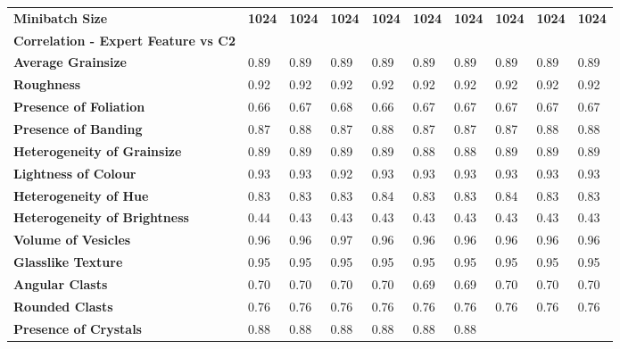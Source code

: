 \begin{longtable}[c]{@{}llllllllll@{}}
\textbf{Minibatch Size} &
  \cellcolor[HTML]{FCE4D6}\textbf{1024} &
  \cellcolor[HTML]{FCE4D6}\textbf{1024} &
  \cellcolor[HTML]{FCE4D6}\textbf{1024} &
  \cellcolor[HTML]{FCE4D6}\textbf{1024} &
  \cellcolor[HTML]{FCE4D6}\textbf{1024} &
  \cellcolor[HTML]{FCE4D6}\textbf{1024} &
  \cellcolor[HTML]{FCE4D6}\textbf{1024} &
  \cellcolor[HTML]{FCE4D6}\textbf{1024} &
  \cellcolor[HTML]{FCE4D6}\textbf{1024} \\
\rowcolor[HTML]{F2F2F2} 
\textbf{Correlation - Expert Feature   vs C2} &
  \textbf{} &
  \textbf{} &
  \textbf{} &
  \textbf{} &
  \textbf{} &
  \textbf{} &
  \textbf{} &
  \textbf{} &
  \textbf{} \\
\textbf{Average Grainsize} &
  0.89 &
  0.89 &
  0.89 &
  0.89 &
  0.89 &
  0.89 &
  0.89 &
  0.89 &
  0.89 \\
\textbf{Roughness} &
  0.92 &
  0.92 &
  0.92 &
  0.92 &
  0.92 &
  0.92 &
  0.92 &
  0.92 &
  0.92 \\
\textbf{Presence of Foliation} &
  0.66 &
  0.67 &
  0.68 &
  0.66 &
  0.67 &
  0.67 &
  0.67 &
  0.67 &
  0.67 \\
\textbf{Presence of Banding} &
  0.87 &
  0.88 &
  0.87 &
  0.88 &
  0.87 &
  0.87 &
  0.87 &
  0.88 &
  0.88 \\
\textbf{Heterogeneity of Grainsize} &
  0.89 &
  0.89 &
  0.89 &
  0.89 &
  0.88 &
  0.88 &
  0.89 &
  0.89 &
  0.89 \\
\textbf{Lightness of Colour} &
  0.93 &
  0.93 &
  0.92 &
  0.93 &
  0.93 &
  0.93 &
  0.93 &
  0.93 &
  0.93 \\
\textbf{Heterogeneity of Hue} &
  0.83 &
  0.83 &
  0.83 &
  0.84 &
  0.83 &
  0.83 &
  0.84 &
  0.83 &
  0.83 \\
\textbf{Heterogeneity of Brightness} &
  0.44 &
  0.43 &
  0.43 &
  0.43 &
  0.43 &
  0.43 &
  0.43 &
  0.43 &
  0.43 \\
\textbf{Volume of Vesicles} &
  0.96 &
  0.96 &
  0.97 &
  0.96 &
  0.96 &
  0.96 &
  0.96 &
  0.96 &
  0.96 \\
\textbf{Glasslike Texture} &
  0.95 &
  0.95 &
  0.95 &
  0.95 &
  0.95 &
  0.95 &
  0.95 &
  0.95 &
  0.95 \\
\textbf{Angular Clasts} &
  0.70 &
  0.70 &
  0.70 &
  0.70 &
  0.69 &
  0.69 &
  0.70 &
  0.70 &
  0.70 \\
\textbf{Rounded Clasts} &
  0.76 &
  0.76 &
  0.76 &
  0.76 &
  0.76 &
  0.76 &
  0.76 &
  0.76 &
  0.76 \\
\textbf{Presence of Crystals} &
  0.88 &
  0.88 &
  0.88 &
  0.88 &
  0.88 &
  0.88 &

\end{longtable}
